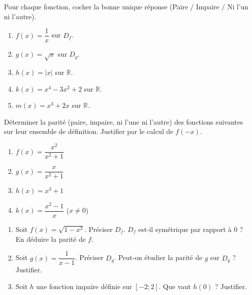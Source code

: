 \documentclass[11pt]{article}
\begin{document}
\begin{exercice}
Pour chaque fonction, cocher la bonne unique réponse (Paire / Impaire / Ni l'un ni l'autre).
\begin{enumerate}
    \item $f(x) = \dfrac{1}{x}$ sur $D_f$.
    \item $g(x) = \sqrt{x}$ sur $D_g$.
    \item $h(x) = |x|$ sur $\mathbb{R}$.
    \item $k(x) = x^4 - 3x^2 + 2$ sur $\mathbb{R}$.
    \item $m(x) = x^3 + 2x$ sur $\mathbb{R}$.
\end{enumerate}
\end{exercice}

\begin{exercice}
Déterminer la parité (paire, impaire, ni l'une ni l'autre) des fonctions suivantes sur leur ensemble de définition. Justifier par le calcul de $f(-x)$.
\begin{enumerate}
    \item $f(x) = \dfrac{x^2}{x^2+1}$
    \item $g(x) = \dfrac{x}{x^2+1}$
    \item $h(x) = x^3 + 1$
    \item $k(x) = \dfrac{x^2-1}{x}$ ($x \neq 0$)
\end{enumerate}
\end{exercice}

\begin{exercice}
\begin{enumerate}
    \item Soit $f(x) = \sqrt{1-x^2}$. Préciser $D_f$. $D_f$ est-il symétrique par rapport à $0$ ? En déduire la parité de $f$.
    \item Soit $g(x) = \dfrac{1}{x-1}$. Préciser $D_g$. Peut-on étudier la parité de $g$ sur $D_g$ ? Justifier.
    \item Soit $h$ une fonction impaire définie sur $[-2; 2]$. Que vaut $h(0)$ ? Justifier.
\end{enumerate}
\end{exercice}
\end{document}
